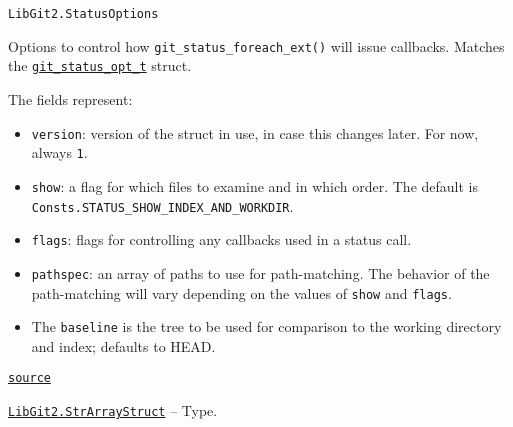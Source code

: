 \begin{adjustwidth}{2em}{0pt}


\begin{verbatim}
LibGit2.StatusOptions
\end{verbatim}

Options to control how \texttt{git\_status\_foreach\_ext()} will issue callbacks. Matches the \href{https://libgit2.org/libgit2/\#HEAD/type/git\_status\_opt\_t}{\texttt{git\_status\_opt\_t}} struct.

The fields represent:

\begin{itemize}
\item \texttt{version}: version of the struct in use, in case this changes later. For now, always \texttt{1}.


\item \texttt{show}: a flag for which files to examine and in which order. The default is \texttt{Consts.STATUS\_SHOW\_INDEX\_AND\_WORKDIR}.


\item \texttt{flags}: flags for controlling any callbacks used in a status call.


\item \texttt{pathspec}: an array of paths to use for path-matching. The behavior of the path-matching will vary depending on the values of \texttt{show} and \texttt{flags}.


\item The \texttt{baseline} is the tree to be used for comparison to the working directory and index; defaults to HEAD.

\end{itemize}


\href{https://github.com/JuliaLang/julia/blob/44fa15b1502a45eac76c9017af94332d4557b251/base/#L0-L15}{\texttt{source}}


\end{adjustwidth}
\hypertarget{10686064701005230750}{} 
\hyperlink{10686064701005230750}{\texttt{LibGit2.StrArrayStruct}}  -- {Type.}

